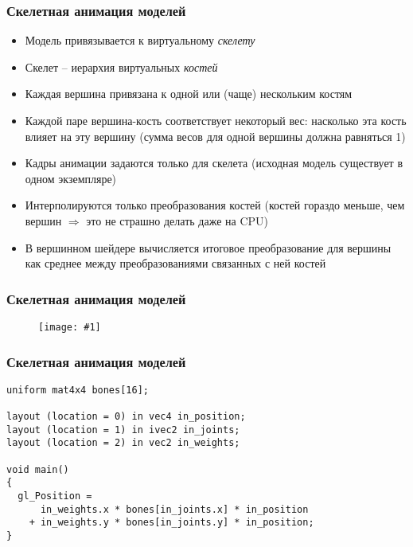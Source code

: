 \documentclass[10pt]{beamer}
\newcommand{\slideimage}[1]{
  \begin{figure}
    \begin{adjustbox}{width=\textwidth, totalheight=\textheight-2\baselineskip-2\baselineskip,keepaspectratio}
      \texttt{[image: \#1]}
    \end{adjustbox}
  \end{figure}
}
\begin{document}
\begin{frame}[fragile]
\frametitle{Скелетная анимация моделей}
\begin{itemize}
\item Модель привязывается к виртуальному \textit{скелету}
\pause
\item Скелет -- иерархия виртуальных \textit{костей}
\pause
\item Каждая вершина привязана к одной или (чаще) нескольким костям
\pause
\item Каждой паре вершина-кость соответствует некоторый вес: насколько эта кость влияет на эту вершину (сумма весов для одной вершины должна равняться 1)
\pause
\item Кадры анимации задаются только для скелета (исходная модель существует в одном экземпляре)
\pause
\item Интерполируются только преобразования костей (костей гораздо меньше, чем вершин \begin{math}\Longrightarrow\end{math} это не страшно делать даже на CPU)
\pause
\item В вершинном шейдере вычисляется итоговое преобразование для вершины как среднее между преобразованиями связанных с ней костей
\end{itemize}
\end{frame}

\begin{frame}[fragile]
\frametitle{Скелетная анимация моделей}
\slideimage{skeletal.jpg}
\end{frame}

\begin{frame}[fragile]
\frametitle{Скелетная анимация моделей}
\begin{verbatim}
uniform mat4x4 bones[16];

layout (location = 0) in vec4 in_position;
layout (location = 1) in ivec2 in_joints;
layout (location = 2) in vec2 in_weights;

void main()
{
  gl_Position =
      in_weights.x * bones[in_joints.x] * in_position
    + in_weights.y * bones[in_joints.y] * in_position;
}
\end{verbatim}
\end{frame}
\end{document}
